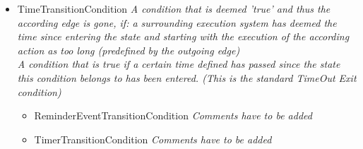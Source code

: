 \begin{itemize}
\begin{itemize}
\begin{itemize}
\begin{itemize}
\begin{itemize}
				\item TimeTransitionCondition \linebreak \textit{A condition that is deemed 'true' and thus the according edge is gone, if: a surrounding execution system has deemed the time since entering the state and starting with the execution of the according action as too long (predefined by the outgoing edge) \\ A condition that is true if a certain time defined has passed since the state this condition belongs to has been entered. (This is the standard TimeOut Exit condition)}
				\begin{itemize} 
					\item ReminderEventTransitionCondition \linebreak \textit{Comments have to be added}
					\item TimerTransitionCondition \linebreak \textit{Comments have to be added}
				\end{itemize}
			\end{itemize}
		\end{itemize}
	\end{itemize}		
			

\end{itemize}
\end{itemize}
